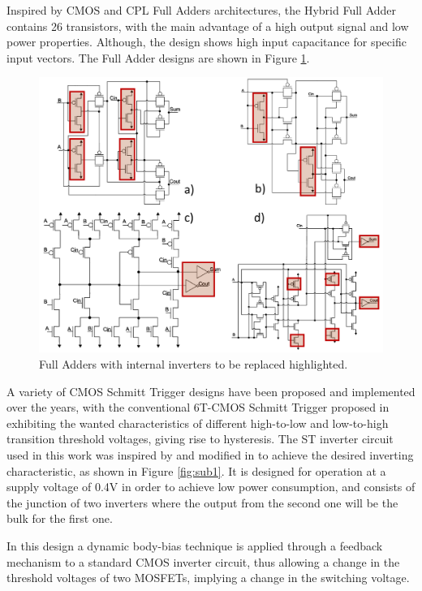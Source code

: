 \documentclass[ecp,tc, english]{iiufrgs}
\begin{document}
Inspired by CMOS and CPL Full Adders architectures, the Hybrid Full Adder \cite{navi2009novel} contains 26 transistors, with the main advantage of a high output signal and low power properties. Although, the design shows high input capacitance for specific input vectors. The Full Adder designs are shown in Figure \ref{fig:Fig5}.

\begin{figure}[ht]
\centering
\includegraphics[width=1\textwidth]{FAs.png}
\caption{Full Adders with internal inverters to be replaced highlighted.}
\label{fig:Fig5}
\end{figure}

A variety of CMOS Schmitt Trigger designs have been proposed and implemented over the years, with the conventional 6T-CMOS Schmitt Trigger proposed in \cite{doki1984cmos} exhibiting the wanted characteristics of different high-to-low and low-to-high transition threshold voltages, giving rise to hysteresis. The ST inverter circuit used in this work was inspired by \cite{zhang2003low} and modified in \cite{dokania2015circuit} to achieve the desired inverting characteristic, as shown in Figure \ref{fig:sub1}. It is designed for operation at a supply voltage of 0.4V in order to achieve low power consumption, and consists of the junction of two inverters where the output from the second one will be the bulk for the first one.  

In this design a dynamic body-bias technique is applied through a feedback mechanism to a standard CMOS inverter circuit, thus allowing a change in the threshold voltages of two MOSFETs, implying a change in the switching voltage. 
\end{document}
